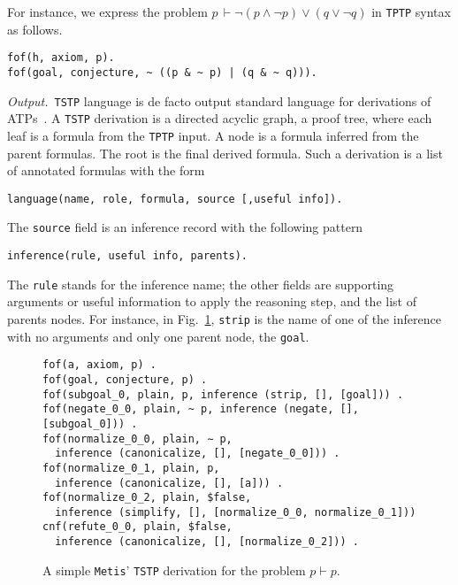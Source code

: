 \documentclass[../main.tex]{subfiles}
\begin{document}
For instance, we express the problem
$p\, \vdash \neg (p \wedge \neg p) \vee (q \vee \neg q)$
in \verb!TPTP! syntax as follows.

\begin{verbatim}
fof(h, axiom, p).
fof(goal, conjecture, ~ ((p & ~ p) | (q & ~ q))).
\end{verbatim}

\textit{Output.}~\verb!TSTP! language is de facto output standard language
for derivations of ATPs~\cite{sutcliffe2004tstp}.
A \verb!TSTP! derivation is a directed acyclic graph, a proof tree, where each leaf
is a formula from the \verb!TPTP! input. A node is a formula inferred from the parent
formulas. The root is the final derived formula. Such a derivation is a list of
annotated formulas with the form

\begin{verbatim}
language(name, role, formula, source [,useful info]).
\end{verbatim}

The \verb!source! field is an inference record with the following pattern
\begin{verbatim}
inference(rule, useful info, parents).
\end{verbatim}

The \verb!rule! stands for the inference name; the other fields are
supporting arguments or useful information to apply the reasoning step, and
the list of parents nodes.
For instance, in Fig.~\ref{fig:metis-proof-tstp}, \verb!strip! is the name of one
of the inference with no arguments and only one parent node, the \verb!goal!.

\begin{figure}
\begin{verbatim}
fof(a, axiom, p) .
fof(goal, conjecture, p) .
fof(subgoal_0, plain, p, inference (strip, [], [goal])) .
fof(negate_0_0, plain, ~ p, inference (negate, [], [subgoal_0])) .
fof(normalize_0_0, plain, ∼ p,
  inference (canonicalize, [], [negate_0_0])) .
fof(normalize_0_1, plain, p,
  inference (canonicalize, [], [a])) .
fof(normalize_0_2, plain, $false,
  inference (simplify, [], [normalize_0_0, normalize_0_1]))
cnf(refute_0_0, plain, $false,
  inference (canonicalize, [], [normalize_0_2])) .
\end{verbatim}
\caption{A simple \texttt{Metis}' \texttt{TSTP} derivation for the problem $p\vdash p$.}
\label{fig:metis-proof-tstp}
\end{figure}

\end{document}
